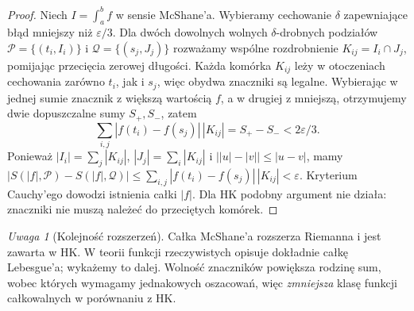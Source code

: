 \documentclass[11pt,a4paper]{article}
\numberwithin{equation}{section}
\theoremstyle{plain}
\theoremstyle{definition}
\theoremstyle{remark}
\newtheorem{uwaga}[twierdzenie]{Uwaga}
\begin{document}
\begin{proof}
Niech $I=\int_a^b f$ w sensie McShane'a. Wybieramy cechowanie $\delta$ zapewniające błąd mniejszy niż $\varepsilon/3$. Dla dwóch dowolnych wolnych $\delta$-drobnych podziałów $\mathcal P=\{(t_i,I_i)\}$ i $\mathcal Q=\{(s_j,J_j)\}$ rozważamy wspólne rozdrobnienie $K_{ij}=I_i\cap J_j$, pomijając przecięcia zerowej długości. Każda komórka $K_{ij}$ leży w otoczeniach cechowania zarówno $t_i$, jak i $s_j$, więc obydwa znaczniki są legalne. Wybierając w jednej sumie znacznik z większą wartością $f$, a w drugiej z mniejszą, otrzymujemy dwie dopuszczalne sumy $S_+,S_-$, zatem
\[
\sum_{i,j}|f(t_i)-f(s_j)|\,|K_{ij}|=S_+-S_-<2\varepsilon/3.
\]
Ponieważ $|I_i|=\sum_j|K_{ij}|$, $|J_j|=\sum_i|K_{ij}|$ i $\bigl||u|-|v|\bigr|\le|u-v|$, mamy
$|S(|f|,\mathcal P)-S(|f|,\mathcal Q)|\le\sum_{i,j}|f(t_i)-f(s_j)|\,|K_{ij}|<\varepsilon$.
Kryterium Cauchy'ego dowodzi istnienia całki $|f|$. Dla HK podobny argument nie działa: znaczniki nie muszą należeć do przeciętych komórek.
\end{proof}
\begin{uwaga}[Kolejność rozszerzeń]
Całka McShane'a rozszerza Riemanna i jest zawarta w HK. W teorii funkcji rzeczywistych opisuje dokładnie całkę Lebesgue'a; wykażemy to dalej. Wolność znaczników powiększa rodzinę sum, wobec których wymagamy jednakowych oszacowań, więc \emph{zmniejsza} klasę funkcji całkowalnych w porównaniu z HK.
\end{uwaga}

\end{document}
